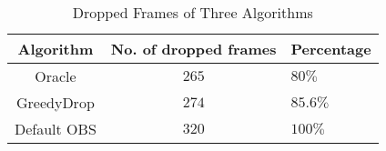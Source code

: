 \begin{table}[tb]
\centering
\caption{Dropped Frames of Three Algorithms}
\label{tab_drop}
{\setlength{\tabcolsep}{1pt}
\begin{tabular}{|c|c|l|}
\hline
\textbf{Algorithm} & \textbf{No. of dropped frames}   &\textbf{Percentage}     \\ \hline
Oracle           &$265$          &$80\%$           \\ \hline
GreedyDrop       &$274$      &$85.6\%$              \\ \hline
Default OBS       &$320$  &$100\%$ \\ \hline
\end{tabular}}
\end{table}
